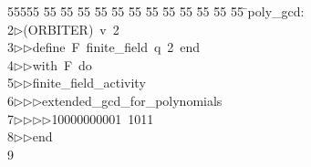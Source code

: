 %
%
\begin{tabbing}
55555 \= 55 \= 55 \= 55 \= 55 \= 55 \= 55 \= 55 \= 55 \= 55 \= 55 \= 55 \= 55 \= \>poly\_gcd:\\[0pt]
2\>$\triangleright$\>(ORBITER)\ v\ 2\ \\[0pt]
3\>$\triangleright$\>$\triangleright$\>define\ F\ finite\_field\ q\ 2\ end\ \\[0pt]
4\>$\triangleright$\>$\triangleright$\>with\ F\ do\ \\[0pt]
5\>$\triangleright$\>$\triangleright$\>finite\_field\_activity\ \\[0pt]
6\>$\triangleright$\>$\triangleright$\>$\triangleright$\>extended\_gcd\_for\_polynomials\ \\[0pt]
7\>$\triangleright$\>$\triangleright$\>$\triangleright$\>$\triangleright$\>10000000001\ 1011\ \\[0pt]
8\>$\triangleright$\>$\triangleright$\>end\\[0pt]
9\>\end{tabbing}
